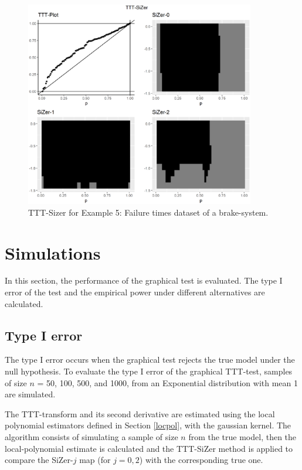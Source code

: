 \documentclass[preprint,12pt]{elsarticle}
\begin{document}
\begin{figure}[htb]
\begin{center}
\includegraphics[height= 9cm]{Fig6_brakes_log10}%
\caption{TTT-Sizer for Example 5: Failure times dataset of a brake-system.}\label{Fig:brakes}
\end{center}
\end{figure}
%

\section{Simulations}\label{sec:sim}
In this section, the performance of the graphical test is evaluated. The type I error of the test and the empirical power under different alternatives are calculated.%

\subsection{Type I error}
The type I error occurs when the graphical test rejects the true model under the null hypothesis. To evaluate the type I error of the graphical TTT-test, samples of size $n$ = 50, 100, 500, and 1000, from an Exponential distribution with mean 1 are simulated.

The TTT-transform and its second derivative are estimated using the local polynomial estimators defined in Section \ref{locpol}, with the gaussian kernel.  
The algorithm consists of simulating a sample of size $n$ from the true model, then the local-polynomial estimate is calculated and the TTT-SiZer method is applied to compare the SiZer-$j$ map (for $j=0,2$) with the corresponding true one.
\end{document}
